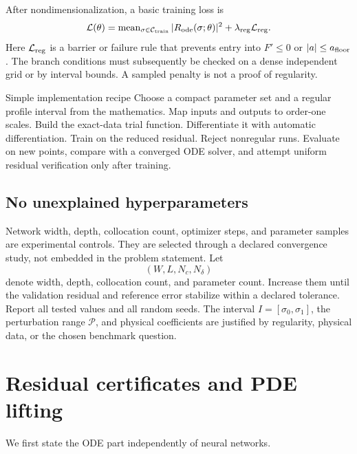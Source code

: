 \documentclass[11pt]{article}
\begin{document}
After nondimensionalization, a basic training loss is
\begin{equation}
 \mathcal L(\theta)
 =\operatorname{mean}_{\sigma\in\mathcal C_{\rm train}}
    |R_{\rm ode}(\sigma;\theta)|^2
  +\lambda_{\rm reg}\mathcal L_{\rm reg}.
 \label{eq:loss}
\end{equation}
Here $\mathcal L_{\rm reg}$ is a barrier or failure rule that prevents entry into $F'\le0$ or $|a|\le a_{\rm floor}$.  The branch conditions must subsequently be checked on a dense independent grid or by interval bounds.  A sampled penalty is not a proof of regularity.

\begin{instruction}{Simple implementation recipe}
Choose a compact parameter set and a regular profile interval from the mathematics.  Map inputs and outputs to order-one scales.  Build the exact-data trial function.  Differentiate it with automatic differentiation.  Train on the reduced residual.  Reject nonregular runs.  Evaluate on new points, compare with a converged ODE solver, and attempt uniform residual verification only after training.
\end{instruction}

\subsection{No unexplained hyperparameters}

Network width, depth, collocation count, optimizer steps, and parameter samples are experimental controls.  They are selected through a declared convergence study, not embedded in the problem statement.  Let
\begin{equation}
 (W,L,N_c,N_\delta)
\end{equation}
denote width, depth, collocation count, and parameter count.  Increase them until the validation residual and reference error stabilize within a declared tolerance.  Report all tested values and all random seeds.  The interval $I=[\sigma_0,\sigma_1]$, the perturbation range $\mathcal P$, and physical coefficients are justified by regularity, physical data, or the chosen benchmark question.

\section{Residual certificates and PDE lifting}

We first state the ODE part independently of neural networks.
\end{document}
